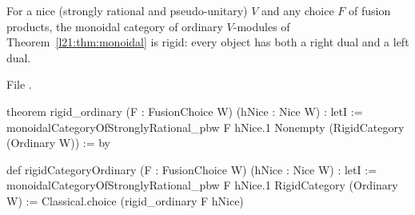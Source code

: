 \begin{theorem}\label{l21:thm:rigid2}
For a nice (strongly rational and pseudo-unitary) $V$ and any choice $F$ of fusion products, the monoidal category of ordinary
$V$-modules of Theorem~\ref{l21:thm:monoidal} is rigid: every object has both a right dual and a left dual.
\end{theorem}
\noindent File .
\begin{leancode}
theorem rigid_ordinary (F : FusionChoice W) (hNice : Nice W) :
    letI := monoidalCategoryOfStronglyRational_pbw F hNice.1
    Nonempty (RigidCategory (Ordinary W)) := by

def rigidCategoryOrdinary (F : FusionChoice W) (hNice : Nice W) :
    letI := monoidalCategoryOfStronglyRational_pbw F hNice.1
    RigidCategory (Ordinary W) :=
  Classical.choice (rigid_ordinary F hNice)
\end{leancode}

